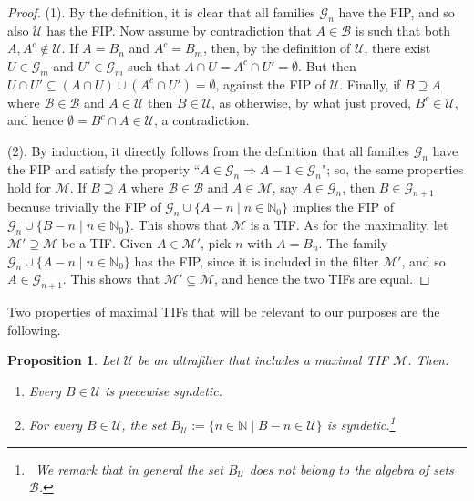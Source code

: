 \documentclass[10pt]{amsart}
\newtheorem{proposition}[theorem]{Proposition}
\theoremstyle{definition}
\theoremstyle{remark}
\def\N{\mathbb{N}}
\def\B{\mathcal{B}}
\def\G{\mathcal{G}}
\def\U{\mathcal{U}}
\begin{document}
\begin{proof}
(1). By the definition, it is clear that all families $\G_n$ have the FIP, and 
so also $\U$ has the FIP. Now assume by contradiction that $A\in\B$ is such that
both $A,A^c\notin\U$. If $A=B_n$ and $A^c=B_m$, then, by the definition
of $\U$, there exist $U\in\G_m$ and $U'\in\G_m$ such that
$A\cap U=A^c\cap U'=\emptyset$. 
But then $U\cap U'\subseteq(A\cap U)\cup(A^c\cap U')=\emptyset$,
against the FIP of $\U$.
Finally, if $B\supseteq A$ where $\B\in\B$ and $A\in\U$ then
$B\in\U$, as otherwise, by what just proved, $B^c\in\U$,
and hence $\emptyset=B^c\cap A\in\U$, a contradiction.

(2). By induction, it directly follows from the definition that all families 
$\G_n$ have the FIP and satisfy the property 
``$A\in\G_n\Rightarrow A-1\in\G_n$";
so, the same properties hold for $\mathcal{M}$.
If $B\supseteq A$ where $\B\in\B$ and $A\in\mathcal{M}$, say $A\in\G_n$,
then $B\in\G_{n+1}$ because trivially the FIP of $\G_n\cup\{A-n\mid n\in\N_0\}$
implies the FIP of $\G_n\cup\{B-n\mid n\in\N_0\}$. This shows that $\mathcal{M}$ is a TIF.
As for the maximality, let $\mathcal{M}'\supseteq\mathcal{M}$ be a TIF. 
Given $A\in\mathcal{M}'$, pick $n$ with $A=B_n$. The family 
$\G_n\cup\{A-n\mid n\in\N_0\}$ has the FIP, since it
is included in the filter $\mathcal{M}'$, and so $A\in\G_{n+1}$.
This shows that $\mathcal{M}'\subseteq\mathcal{M}$, and hence the
two TIFs are equal.
\end{proof}


Two properties of maximal TIFs that will be relevant to our
purposes are the following.

\begin{proposition}\label{syndetic}
Let $\U$ be an ultrafilter that includes a maximal TIF $\mathcal{M}$.
Then:
\begin{enumerate}
\item
Every $B\in\U$ is piecewise syndetic.
\item
For every $B\in\U$, the set $B_\U:=\{n\in\N\mid B-n\in\U\}$ is syndetic.\footnote
{~We remark that in general the set $B_\U$ does not belong to the algebra 
of sets $\B$.}

\end{enumerate}
\end{proposition}
\end{document}
